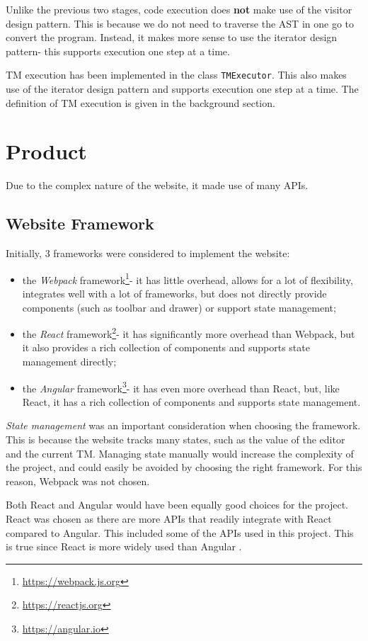 Unlike the previous two stages, code execution does \textbf{not} make use of the visitor design pattern. This is because we do not need to traverse the AST in one go to convert the program. Instead, it makes more sense to use the iterator design pattern- this supports execution one step at a time.

TM execution has been implemented in the class \texttt{TMExecutor}. This also makes use of the iterator design pattern and supports execution one step at a time. The definition of TM execution is given in the background section.

\section{Product}
Due to the complex nature of the website, it made use of many APIs.

\subsection{Website Framework}

Initially, 3 frameworks were considered to implement the website:
\begin{itemize}
    \item the \emph{Webpack} framework\footnote{\url{https://webpack.js.org}}- it has little overhead, allows for a lot of flexibility, integrates well with a lot of frameworks, but does not directly provide components (such as toolbar and drawer) or support state management;
    \item the \emph{React} framework\footnote{\url{https://reactjs.org}}- it has significantly more overhead than Webpack, but it also provides a rich collection of components and supports state management directly;
    \item the \emph{Angular} framework\footnote{\url{https://angular.io}}- it has even more overhead than React, but, like React, it has a rich collection of components and supports state management.
\end{itemize}

\emph{State management} was an important consideration when choosing the framework. This is because the website tracks many states, such as the value of the editor and the current TM. Managing state manually would increase the complexity of the project, and could easily be avoided by choosing the right framework. For this reason, Webpack was not chosen.

Both React and Angular would have been equally good choices for the project. React was chosen as there are more APIs that readily integrate with React compared to Angular. This included some of the APIs used in this project. This is true since React is more widely used than Angular \citep{react_v_angular}. 

